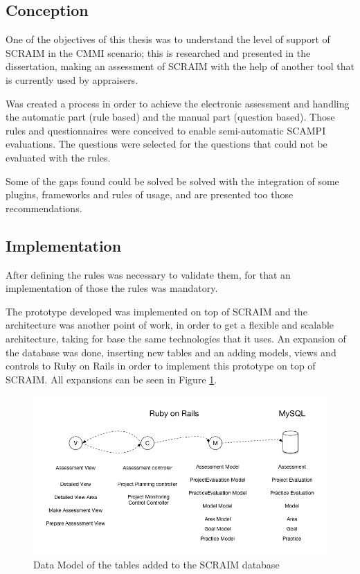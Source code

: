 \documentclass[9pt,a4paper]{extarticle}
\begin{document}
\begin{multicols}{2}
\subsection{Conception}
One of the objectives of this thesis was to understand the level of support of SCRAIM in the CMMI scenario; this is researched and presented in the dissertation, making an assessment of SCRAIM with the help of another tool that is currently used by appraisers.

Was created a process in order to achieve the electronic assessment and handling the automatic part (rule based) and the manual part (question based). Those rules and questionnaires were conceived to enable semi-automatic SCAMPI evaluations.
The questions were selected for the questions that could not be evaluated with the rules.

Some of the gaps found could be solved be solved with the integration of some plugins, frameworks and rules of usage, and are presented too those recommendations.

\subsection{Implementation}

After defining the rules was necessary to validate them, for that an implementation of those the rules was mandatory.

The prototype developed was implemented on top of SCRAIM and the architecture was another point of work, in order to get a flexible and scalable architecture, taking for base the same technologies that it uses.
An  expansion of the database was done, inserting new tables and an adding models, views and controls to Ruby on Rails in order to implement this prototype on top of SCRAIM. All expansions can be seen in  Figure \ref{fig:figura}.

\begin{figure}[H]
	\centerline{\includegraphics[scale=.3]{presentation.png}}
	\caption{Data Model of the tables added to the SCRAIM database}  
	\label{fig:figura}
\end{figure}




\end{multicols}
\end{document}
